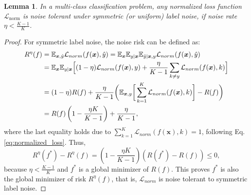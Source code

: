 \documentclass{article}
\newtheorem{lemma}{Lemma}
\newcommand{\E}{\mathbb{E}}
\def \xx {{\bm{x}}}
\def \L  {\mathcal{L}}
\begin{document}
\begin{lemma}
In a multi-class classification problem, any normalized loss function $\L_{\text{norm}}$ is noise tolerant under symmetric (or uniform) label noise, if noise rate $\eta < \frac{K-1}{K}$.
\end{lemma}
\begin{proof}
For symmetric label noise, the noise risk can be defined as:
\begin{align*}
	\small
	R^\eta(f) & =  \E_{\xx, \hat{y}} \L_{norm}(f(\xx), \hat{y}) =  \E_{\xx} \E_{y | \xx} \E_{\hat{y} | \xx, y} \L_{norm}(f(\xx), \hat{y}) \\
		&= \E_{\xx} \E_{y | \xx} \Big[ (1-\eta) \L_{norm}(f(\xx), y) + \frac{\eta}{K-1} \sum_{k\neq y} \L_{norm}(f(\xx), k) \Big] \\
		& =  (1 - \eta) R(f) +  \frac{\eta}{K-1} \bigg(\E_{\xx, y}\bigg[\sum_{k=1}^{K}\L_{norm}(f(\xx), k)\bigg] - R(f)\bigg)\\
		& = R(f)\left(1-\frac{\eta K}{K-1}\right) + \frac{\eta}{K-1},
\end{align*}
where the last equality holds due to $\sum_{k=1}^{K}\L_{norm}(f(\xx), k) = 1$, following Eq. \eqref{eq:normalized_loss}. Thus,
	\[R^\eta(f^*)-R^\eta(f)=(1-\frac{\eta K}{K-1})(R(f^*)-R(f)) \leq 0,\]
because $\eta < \frac{K-1}{K}$ and $f^*$ is a global minimizer of $R(f)$. This proves $f^*$ is also the global minimizer of risk $R^\eta(f)$, that is, $\L_{norm}$ is noise tolerant to symmetric label noise. 
\end{proof}
\end{document}
